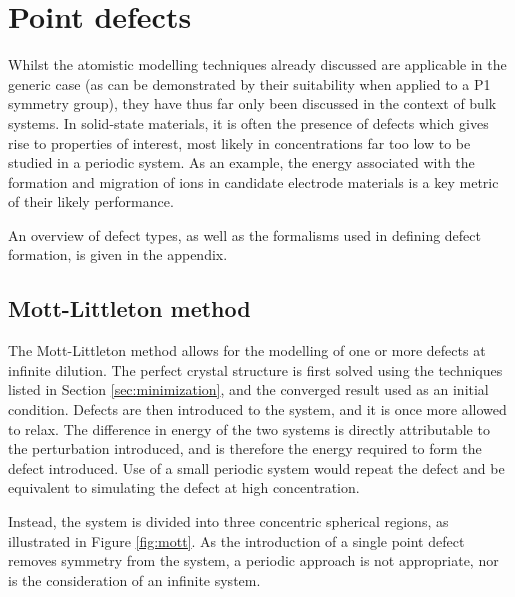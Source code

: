 \newpage


\section{Point defects}
Whilst the atomistic modelling techniques already discussed are applicable in the generic case (as can be demonstrated by their suitability when applied to a P1 symmetry group), they have thus far only been discussed in the context of bulk systems.
In solid-state materials, it is often the presence of defects which gives rise to properties of interest, most likely in concentrations far too low to be studied in a periodic system.
As an example, the energy associated with the formation and migration of  ions in candidate electrode materials is a key metric of their likely performance.

An overview of defect types, as well as the formalisms used in defining defect formation, is given in the appendix.

\subsection{Mott-Littleton method}
The Mott-Littleton method allows for the modelling of one or more defects at infinite dilution.
The perfect crystal structure is first solved using the techniques listed in Section \ref{sec:minimization}, and the converged result used as an initial condition.
Defects are then introduced to the system, and it is once more allowed to relax.
The difference in energy of the two systems is directly attributable to the perturbation introduced, and is therefore the energy required to form the defect introduced.
Use of a small periodic system would repeat the defect and be equivalent to simulating the defect at high concentration.

Instead, the system is divided into three concentric spherical regions, as illustrated in Figure \ref{fig:mott}.
As the introduction of a single point defect removes symmetry from the system, a periodic approach is not appropriate, nor is the consideration of an infinite system.

